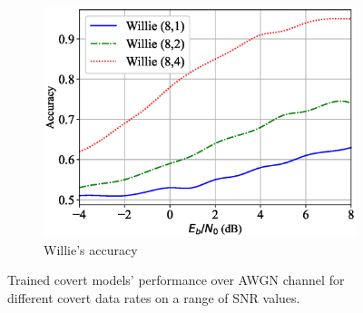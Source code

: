 \begin{figure}[tp!]
\begin{subfigure}{0.3\textwidth}
		\includegraphics[width=\linewidth]{figs/willie_accuracy_awgn}
		\caption{Willie's accuracy}	
		\label{fig:awgn_resutls_willie}
	\end{subfigure}
	\caption{Trained covert models' performance over AWGN channel for different covert data rates on a range of SNR values.}
	\label{fig:awgn_results}
\end{figure}
